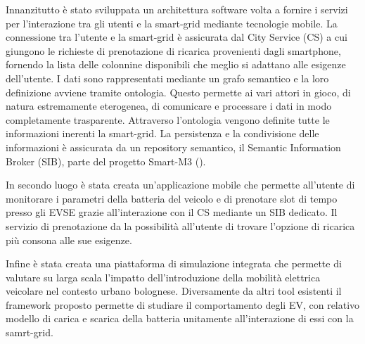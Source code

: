 Innanzitutto è stato sviluppata un architettura software volta a fornire i servizi per l'interazione tra gli utenti e la smart-grid mediante tecnologie mobile. La connessione tra l'utente e la smart-grid è assicurata dal City Service (CS) a cui giungono le richieste di prenotazione di ricarica provenienti dagli smartphone, fornendo la lista delle colonnine disponibili che meglio si adattano alle esigenze dell'utente. I dati sono rappresentati mediante un grafo semantico e la loro definizione avviene tramite ontologia. Questo permette ai vari attori in gioco, di natura estremamente eterogenea, di comunicare e processare i dati in modo completamente trasparente. Attraverso l'ontologia vengono definite tutte le informazioni inerenti la smart-grid. La persistenza e la condivisione delle informazioni è assicurata da un repository semantico, il Semantic Information Broker (SIB), parte del progetto Smart-M3 (\cite{smart2013}). 

In secondo luogo è stata creata un'applicazione mobile che permette all'utente di monitorare i parametri della batteria del veicolo e di prenotare slot di tempo presso gli EVSE grazie all'interazione con il CS mediante un SIB dedicato. Il servizio di prenotazione da la possibilità all'utente di trovare l'opzione di ricarica più consona alle sue esigenze.

Infine è stata creata una piattaforma di simulazione integrata che permette di valutare su larga scala
l'impatto dell'introduzione della mobilità elettrica veicolare nel contesto urbano bolognese. Diversamente da altri tool esistenti il framework proposto permette di studiare il comportamento degli EV, con relativo modello di carica e scarica della batteria unitamente all'interazione di essi con la samrt-grid. 






